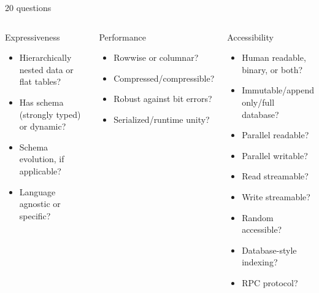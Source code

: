 \documentclass[aspectratio=169]{beamer}
\begin{document}
\begin{frame}{20 questions}
\vspace{0.15 cm}
\small
\begin{columns}

\begin{block}{Expressiveness}
\vspace{-0.2 cm}
\begin{itemize}\setlength{\itemsep}{-0.05 cm}
\item Hierarchically nested data or flat tables?
\item Has schema (strongly typed) or dynamic?
\item Schema evolution, if applicable?
\item Language agnostic or specific?
\end{itemize}
\end{block}

\vspace{0.5 cm}

\begin{block}{Performance}
\vspace{-0.2 cm}
\begin{itemize}\setlength{\itemsep}{-0.05 cm}
\item Rowwise or columnar?
\item Compressed/compressible?
\item Robust against bit errors?
\item Serialized/runtime unity?
\end{itemize}
\end{block}


\begin{block}{Accessibility}
\vspace{-0.2 cm}
\begin{itemize}\setlength{\itemsep}{-0.05 cm}
\item Human readable, binary, or both?
\item Immutable/append only/full database?
\item Parallel readable?
\item Parallel writable?
\item Read streamable?
\item Write streamable?
\item Random accessible?
\item Database-style indexing?
\item RPC protocol?
\end{itemize}
\end{block}


\end{columns}
\end{frame}
\end{document}
